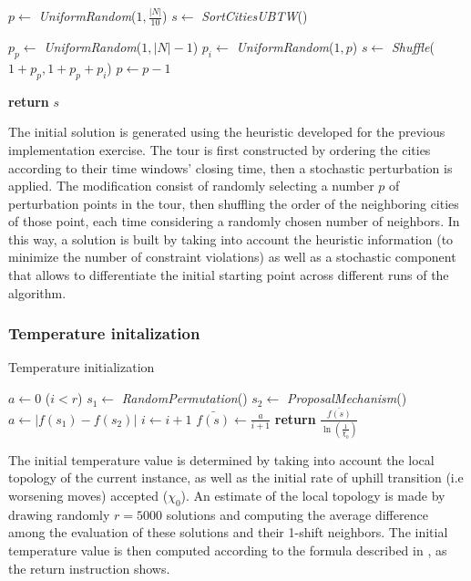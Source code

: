 \begin{homeworkProblem}
\begin{algorithm}
\begin{algorithmic}
\State $p \gets$ \emph{UniformRandom}($1,\frac{|N|}{10}$) 
\State $s \gets$ \emph{SortCitiesUBTW}() 	

  \State $p_p \gets$ \emph{UniformRandom}($1,|N|-1$) 
  \State $p_i \gets$ \emph{UniformRandom}($1,p$) 
  \State $s \gets$ \emph{Shuffle}($1+p_p,1+p_p+p_i$) 
  \State $p \gets p-1$
\EndWhile	

\State \textbf{return} $s$

\EndProcedure    
\end{algorithmic}
\end{algorithm}

The initial solution is generated using the heuristic developed for the previous implementation exercise.
The tour is first constructed by ordering the cities according to their time windows' closing time, then a stochastic perturbation is applied.
The modification consist of randomly selecting a number $p$ of perturbation points in the tour, then shuffling the order of the neighboring cities of those point, each time considering a randomly chosen number of neighbors.
In this way, a solution is built by taking into account the heuristic information (to minimize the number of constraint violations) as well as a stochastic component that allows to differentiate the initial starting point across different runs of the algorithm.

\subsubsection{Temperature initalization}
\begin{algorithm}
\caption{Temperature initialization}\label{saTInit}
\begin{algorithmic}
  \State $a \gets 0$
  \While($i < r$)
    \State $s_1 \gets$ \emph{RandomPermutation}()
    \State $s_2 \gets$ \emph{ProposalMechanism}()
    \State $a \gets |f(s_1)-f(s_2)|$
    \State $i \gets i + 1$
  \EndWhile
  \State $\bar{f(s)} \gets \frac{a}{i+1}$
  \State \textbf{return} $\frac{\bar{f(s)}}{\ln(\frac{1}{\chi_0})}$
\EndProcedure
\end{algorithmic}
\end{algorithm}

The initial temperature value is determined by taking into account the local topology of the current instance, as well as the initial rate of uphill transition (i.e worsening moves) accepted ($\chi_0$).
An estimate of the local topology is made by drawing randomly $r=5000$ solutions and computing the average difference among the evaluation of these solutions and their 1-shift neighbors.
The initial temperature value is then computed according to the formula described in \cite{ohlmann2007compressed}, as the return instruction shows.


\end{homeworkProblem}
